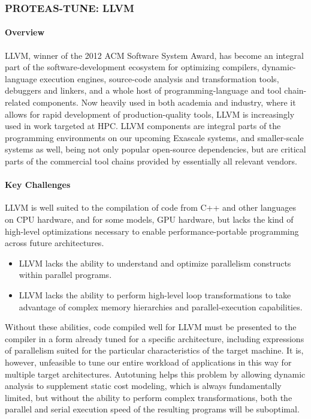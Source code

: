 \subsubsection{ PROTEAS-TUNE: LLVM} 
\label{sec:PROTEAS_TUNE_LLVM}

\paragraph{Overview}

LLVM, winner of the 2012 ACM Software System Award, has become an integral part of the software-development ecosystem for optimizing compilers, dynamic-language execution engines, source-code analysis and transformation tools, debuggers and linkers, and a whole host of programming-language and tool chain-related components. Now heavily used in both academia and industry, where it allows for rapid development of production-quality tools, LLVM is increasingly used in work targeted at HPC. LLVM components are integral parts of the programming environments on our upcoming Exascale systems, and smaller-scale systems as well, being not only popular open-source dependencies, but are critical parts of the commercial tool chains provided by essentially all relevant vendors.

\paragraph{Key Challenges}

LLVM is well suited to the compilation of code from C++ and other languages on CPU hardware, and for some models, GPU hardware, but lacks the kind of high-level optimizations necessary to enable performance-portable programming across future architectures.
\begin{itemize}
\item LLVM lacks the ability to understand and optimize parallelism constructs within parallel programs.
\item LLVM lacks the ability to perform high-level loop transformations to take advantage of complex memory hierarchies and parallel-execution capabilities.
\end{itemize}

Without these abilities, code compiled well for LLVM must be presented to the compiler in a form already tuned for a specific architecture, including expressions of parallelism suited for the particular characteristics of the target machine. It is, however, unfeasible to tune our entire workload of applications in this way for multiple target architectures. Autotuning helps this problem by allowing dynamic analysis to supplement static cost modeling, which is always fundamentally limited, but without the ability to perform complex transformations, both the parallel and serial execution speed of the resulting programs will be suboptimal.

